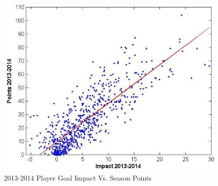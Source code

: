 \documentclass[]{article}
\begin{document}
%
%

\begin{figure}[ht]
\includegraphics[width = 1.0\columnwidth]{points_vs_impact}
\caption{2013-2014 Player Goal Impact Vs. Season Points}
\label{fig:points-vs-impact}
\end{figure}



%
\end{document}
